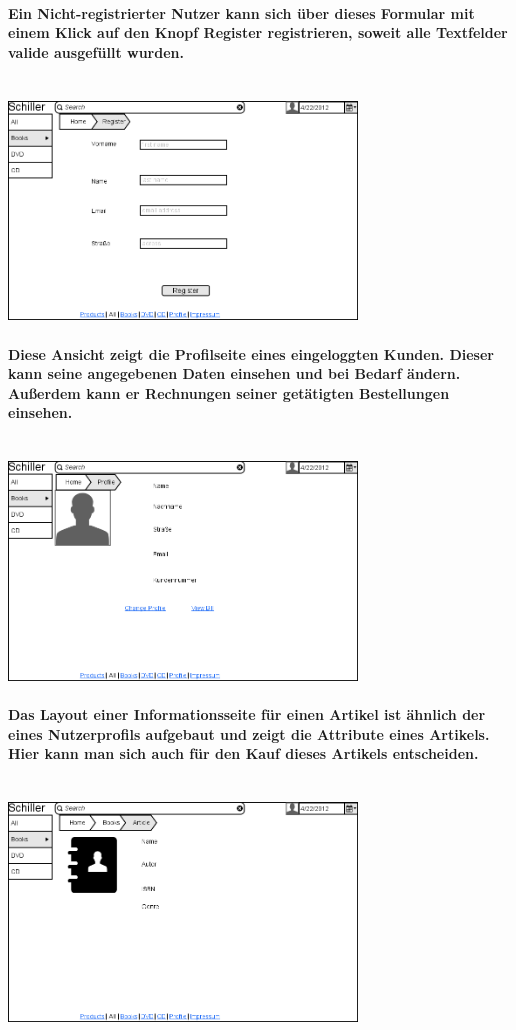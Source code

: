 \documentclass[a4paper]{article}
\begin{document}
\paragraph{Ein Nicht-registrierter Nutzer kann sich über dieses Formular mit einem Klick auf den Knopf Register registrieren, soweit alle Textfelder valide ausgefüllt wurden.\\ \\}
\includegraphics[width=350px]{3Register.png}

\paragraph{Diese Ansicht zeigt die Profilseite eines eingeloggten Kunden. Dieser kann seine angegebenen Daten einsehen und bei Bedarf ändern. Außerdem kann er Rechnungen seiner getätigten Bestellungen einsehen.\\ \\}
\includegraphics[width=350px]{4ProfileView.png}

\paragraph{Das Layout einer Informationsseite für einen Artikel ist ähnlich der eines Nutzerprofils aufgebaut und zeigt die Attribute eines Artikels. Hier kann man sich auch für den Kauf dieses Artikels entscheiden.\\ \\}
\includegraphics[width=350px]{5ArticleView.png}
\end{document}
